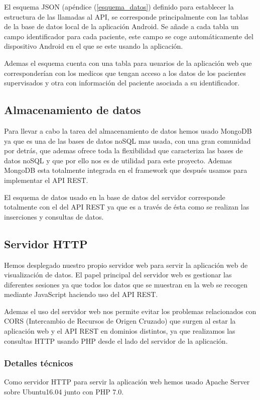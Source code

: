 \documentclass[11pt,spanish]{article}
\begin{document}
El esquema JSON (apéndice (\ref{esquema_datos}) definido para establecer la estructura de las llamadas al API, se corresponde principalmente con las tablas de la base de datos local de la aplicación Android. Se añade a cada tabla un campo identificador para cada paciente, este campo se coge automáticamente del dispositivo Android en el que se este usando la aplicación.
\newline

Ademas el esquema cuenta con una tabla para usuarios de la aplicación web que corresponderían con los medicos que tengan acceso a los datos de los pacientes supervisados y otra con información del paciente asociada a su identificador.
\newline

\subsection{Almacenamiento de datos}
Para llevar a cabo la tarea del almacenamiento de datos hemos usado MongoDB ya que es una de las bases de datos noSQL mas usada, con una gran comunidad por detrás, que ademas ofrece toda la flexibilidad que caracteriza las bases de datos noSQL y que por ello nos es de utilidad para este proyecto. Ademas MongoDB esta totalmente integrada en el framework que después usamos para implementar el API REST.

El esquema de datos usado en la base de datos del servidor corresponde totalmente con el del API REST ya que es a través de ésta como se realizan las inserciones y consultas de datos.

\subsection{Servidor HTTP}
Hemos desplegado nuestro propio servidor web para servir la aplicación web de visualización de datos. El papel principal del servidor web es gestionar las diferentes sesiones ya que todos los datos que se muestran en la web se recogen mediante JavaScript haciendo uso del API REST. 
\newline

Ademas el uso del servidor web nos permite evitar los problemas relacionados con CORS (Intercambio de Recursos de Origen Cruzado) que surgen al estar la aplicación web y el API REST en dominios distintos, ya que realizamos las consultas HTTP usando PHP desde el lado del servidor de la aplicación.

\subsubsection{Detalles técnicos}
Como servidor HTTP para servir la aplicación web hemos usado Apache Server sobre Ubuntu16.04 junto con PHP 7.0.
\end{document}
